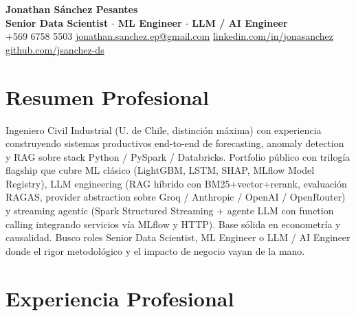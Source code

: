 \documentclass[a4paper,10pt]{article}
\begin{document}
\begin{center}
    {\Large\bfseries Jonathan Sánchez Pesantes} \\[3pt]
    {\normalsize \textbf{Senior Data Scientist $\cdot$ ML Engineer $\cdot$ LLM / AI Engineer}} \\[4pt]
    {\small +569 6758 5503 \enspace\textbullet\enspace \href{mailto:jonathan.sanchez.ep@gmail.com}{jonathan.sanchez.ep@gmail.com} \enspace\textbullet\enspace \href{https://www.linkedin.com/in/jonasanchez}{linkedin.com/in/jonasanchez} \enspace\textbullet\enspace \href{https://github.com/jsanchez-ds}{github.com/jsanchez-ds}}
\end{center}

\section*{Resumen Profesional}
Ingeniero Civil Industrial (U. de Chile, distinción máxima) con experiencia construyendo sistemas productivos end-to-end de forecasting, anomaly detection y RAG sobre stack Python / PySpark / Databricks. Portfolio público con trilogía flagship que cubre ML clásico (LightGBM, LSTM, SHAP, MLflow Model Registry), LLM engineering (RAG híbrido con BM25+vector+rerank, evaluación RAGAS, provider abstraction sobre Groq / Anthropic / OpenAI / OpenRouter) y streaming agentic (Spark Structured Streaming + agente LLM con function calling integrando servicios vía MLflow y HTTP). Base sólida en econometría y causalidad. Busco roles Senior Data Scientist, ML Engineer o LLM / AI Engineer donde el rigor metodológico y el impacto de negocio vayan de la mano.

\section*{Experiencia Profesional}
\end{document}

